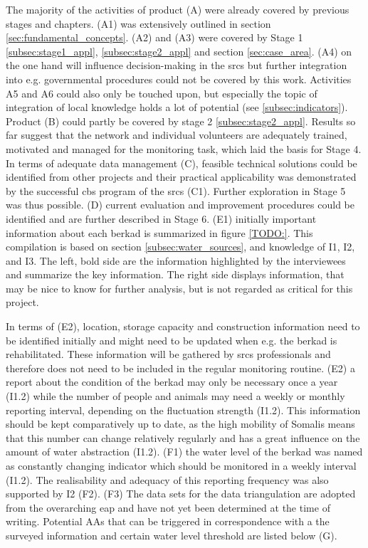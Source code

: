 The majority of the activities of product (A) were already covered by previous stages and chapters. (A1) was extensively outlined in section \ref*{sec:fundamental_concepts}. (A2) and (A3) were covered by Stage 1 \ref*{subsec:stage1_appl}, \ref*{subsec:stage2_appl} and section \ref*{sec:case_area}. (A4) on the one hand will influence decision-making in the \acrshort{srcs} but further integration into e.g. governmental procedures could not be covered by this work. Activities A5 and A6 could also only be touched upon, but especially the topic of integration of local knowledge holds a lot of potential (see \ref*{subsec:indicators}).\newline
Product (B) could partly be covered by stage 2 \ref*{subsec:stage2_appl}. Results so far suggest that the network and individual volunteers are adequately trained, motivated and managed for the monitoring task, which laid the basis for Stage 4. In terms of adequate data management (C), feasible technical solutions could be identified from other projects and their practical applicability was demonstrated by the successful \acrshort{cbs} program of the \acrshort{srcs} (C1). Further exploration in Stage 5 was thus possible. (D) current evaluation and improvement procedures could be identified and are further described in Stage 6.\newline
(E1) initially important information about each berkad is summarized in figure \ref*{TODO:}. This compilation is based on section \ref*{subsec:water_sources}, and knowledge of I1, I2, and I3. The left, bold side are the information highlighted by the interviewees and summarize the key information. The right side displays information, that may be nice to know for further analysis, but is not regarded as critical for this project.


In terms of (E2), location, storage capacity and construction information need to be identified initially and might need to be updated when e.g. the berkad is rehabilitated. These information will be gathered by \acrshort{srcs} professionals and therefore does not need to be included in the regular monitoring routine. (E2) a report about the condition of the berkad may only be necessary once a year (I1.2) while the number of people and animals may need a weekly or monthly reporting interval, depending on the fluctuation strength (I1.2). This information should be kept comparatively up to date, as the high mobility of Somalis means that this number can change relatively regularly and has a great influence on the amount of water abstraction (I1.2).\newline
(F1) the water level of the berkad was named as constantly changing indicator which should be monitored in a weekly interval (I1.2). The realisability and adequacy of this reporting frequency was also supported by I2 (F2). (F3) The data sets for the data triangulation are adopted from the overarching \acrshort{eap} and have not yet been determined at the time of writing.\newline 
Potential AAs that can be triggered in correspondence with a the surveyed information and certain water level threshold are listed below (G). 

